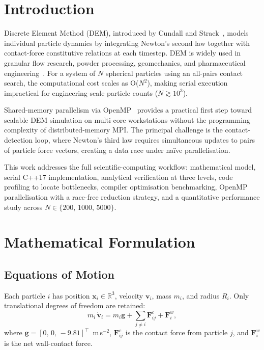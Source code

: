 \documentclass[journal]{IEEEtran}
\begin{document}
\IEEEpeerreviewmaketitle

\section{Introduction}
 Discrete Element Method (DEM), introduced by
Cundall and Strack~\cite{cundall1979}, models individual particle
dynamics by integrating Newton's second law together with
contact-force constitutive relations at each timestep.  DEM is
widely used in granular flow research, powder processing, geomechanics,
and pharmaceutical engineering~\cite{luding2008}.  For a system of $N$
spherical particles using an all-pairs contact search, the computational
cost scales as O($N^{2}$), making serial execution impractical for
engineering-scale particle counts ($N \gtrsim 10^{3}$).

Shared-memory parallelism via OpenMP~\cite{openmp2018} provides a
practical first step toward scalable DEM simulation on multi-core
workstations without the programming complexity of distributed-memory
MPI.  The principal challenge is the contact-detection loop, where
Newton's third law requires simultaneous updates to pairs of particle
force vectors, creating a data race under na\"{i}ve parallelisation.

This work addresses the full scientific-computing workflow:
mathematical model, serial C++17 implementation, analytical
verification at three levels, code profiling to locate bottlenecks,
compiler optimisation benchmarking, OpenMP parallelisation with a
race-free reduction strategy, and a quantitative performance study
across $N \in \{200,\,1000,\,5000\}$.

\section{Mathematical Formulation}

\subsection{Equations of Motion}
Each particle $i$ has position $\mathbf{x}_i \in \mathbb{R}^3$,
velocity $\mathbf{v}_i$, mass $m_i$, and radius $R_i$.  Only
translational degrees of freedom are retained:
\begin{equation}
  m_i\,\dot{\mathbf{v}}_i = m_i\mathbf{g}
    + \sum_{j \neq i}\mathbf{F}^{c}_{ij} + \mathbf{F}^{w}_{i},
  \label{eq:eom}
\end{equation}
where $\mathbf{g} = [0,\,0,\,-9.81]^{\!\top}$~m\,s$^{-2}$,
$\mathbf{F}^{c}_{ij}$ is the contact force from particle $j$, and
$\mathbf{F}^{w}_{i}$ is the net wall-contact force.
\end{document}
